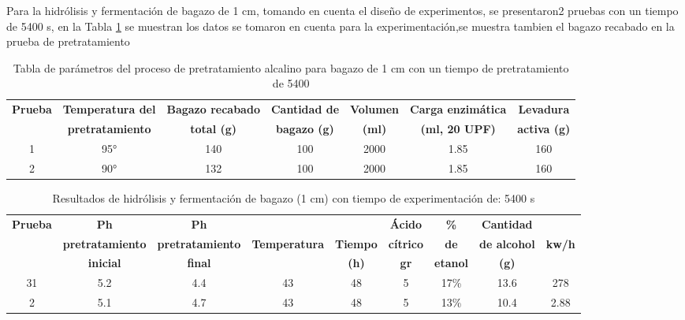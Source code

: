 \documentclass[12pt]{article}
\begin{document}
	Para la hidrólisis y fermentación de bagazo de 1 cm, tomando en cuenta el diseño de experimentos, se presentaron2 pruebas con un tiempo de 5400 s, en la Tabla \ref{hidrolisis alcalino varios_5400_1} se muestran los datos se tomaron en cuenta para la experimentación,se muestra tambien el bagazo recabado en la prueba de pretratamiento	
		\begin{table}[H]
		\centering
		\caption{Tabla de parámetros del proceso de pretratamiento alcalino para bagazo de 1 cm con un tiempo de pretratamiento de 5400}
		\label{hidrolisis alcalino varios_5400_1}
		\resizebox{16cm}{!} {
			\begin{tabular}{|c|c|c|c|c|c|c|}
				\hline
				\textbf{Prueba}	& \textbf{Temperatura del} & \textbf{Bagazo recabado} & \textbf{Cantidad de} & \textbf{Volumen} & \textbf{Carga enzimática} & \textbf{Levadura} \\
				&	\textbf{pretratamiento} & \textbf{total (g)} & \textbf{bagazo (g)} & \textbf{(ml)} & \textbf{(ml, 20 UPF)} & \textbf{activa (g)} \\ \hline		
				1	&	95° & 140 & 100 & 2000 & 1.85 & 160 \\ \hline
				2	&	90° & 132 & 100 & 2000 & 1.85 & 160 \\ \hline
				
		\end{tabular} }
		
	\end{table}
	
	
		
	\begin{table}[H]
		\centering
		\caption{Resultados de hidrólisis y fermentación de bagazo (1 cm) con tiempo de experimentación de: 5400 s}
		\label{hidrolisis alcalino 1 cm_5400}
		\resizebox{16cm}{!} {
			\begin{tabular}{|c|c|c|c|c|c|c|c|c|}
				\hline
				\textbf{Prueba}	& \textbf{Ph}& \textbf{Ph} &  &  & \textbf{Ácido} &\textbf{\%} & \textbf{Cantidad} & \\
				&	\textbf{pretratamiento} & 	\textbf{pretratamiento} & \textbf{Temperatura} & \textbf{Tiempo} & \textbf{cítrico} & \textbf{de } & \textbf{de alcohol } & \textbf{kw/h}\\
				&	\textbf{inicial}& \textbf{final} &  &\textbf{(h)}  & \textbf{gr} & \textbf{etanol }& \textbf{(g) }&\\ \hline		
   
			31	&5.2 & 4.4 & 43 & 48 & 5 & 17\% & 13.6 & 278  \\ \hline
			2&5.1 & 4.7 & 43 & 48 & 5 & 13\% & 10.4 & 2.88  \\ \hline
	

				
				
		\end{tabular} }
		
	\end{table}
	
\end{document}

